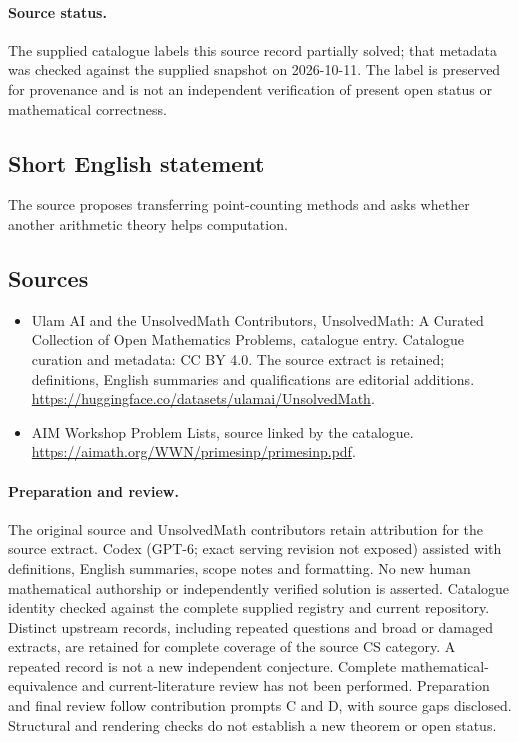 \documentclass[11pt]{article}
\begin{document}
\paragraph{Source status.}
The supplied catalogue labels this source record partially solved; that metadata was checked against the supplied snapshot on 2026-10-11. The label is preserved for provenance and is not an independent verification of present open status or mathematical correctness.
\subsection{Short English statement}
The source proposes transferring point-counting methods and asks whether another arithmetic theory helps computation.
\subsection{Sources}
\begin{itemize}
\item[\hypertarget{source:statement:1}{S1}] Ulam AI and the UnsolvedMath Contributors, UnsolvedMath: A Curated Collection of Open Mathematics Problems, catalogue entry. Catalogue curation and metadata: CC BY 4.0. The source extract is retained; definitions, English summaries and qualifications are editorial additions.
\url{https://huggingface.co/datasets/ulamai/UnsolvedMath}.
\item[\hypertarget{source:statement:2}{S2}] AIM Workshop Problem Lists, source linked by the catalogue.
\url{https://aimath.org/WWN/primesinp/primesinp.pdf}.
\end{itemize}
\paragraph{Preparation and review.}
The original source and UnsolvedMath contributors retain attribution for the source extract. Codex (GPT-6; exact serving revision not exposed) assisted with definitions, English summaries, scope notes and formatting. No new human mathematical authorship or independently verified solution is asserted. Catalogue identity checked against the complete supplied registry and current repository. Distinct upstream records, including repeated questions and broad or damaged extracts, are retained for complete coverage of the source CS category. A repeated record is not a new independent conjecture. Complete mathematical-equivalence and current-literature review has not been performed. Preparation and final review follow contribution prompts C and D, with source gaps disclosed. Structural and rendering checks do not establish a new theorem or open status.
\label{end:statement}
\end{document}
